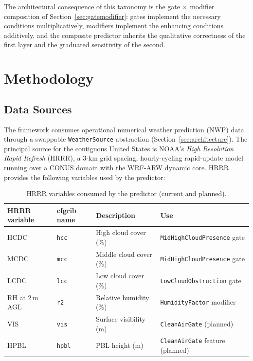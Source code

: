 \documentclass[11pt,a4paper]{article}
\begin{document}
The architectural consequence of this taxonomy is the gate $\times$ modifier composition of Section~\ref{sec:gatemodifier}: gates implement the necessary conditions multiplicatively, modifiers implement the enhancing conditions additively, and the composite predictor inherits the qualitative correctness of the first layer and the graduated sensitivity of the second.

\section{Methodology}
\label{sec:methodology}

\subsection{Data Sources}
\label{sec:datasources}

The framework consumes operational numerical weather prediction (NWP) data through a swappable \texttt{WeatherSource} abstraction (Section~\ref{sec:architecture}). The principal source for the contiguous United States is NOAA's \emph{High Resolution Rapid Refresh} (HRRR), a 3-km grid spacing, hourly-cycling rapid-update model running over a CONUS domain with the WRF-ARW dynamic core. HRRR provides the following variables used by the predictor:

\begin{table}[H]
\centering
\small
\begin{tabular}{llll}
\toprule
HRRR variable & cfgrib name & Description & Use \\
\midrule
HCDC & \texttt{hcc} & High cloud cover (\%) & \texttt{MidHighCloudPresence} gate \\
MCDC & \texttt{mcc} & Middle cloud cover (\%) & \texttt{MidHighCloudPresence} gate \\
LCDC & \texttt{lcc} & Low cloud cover (\%) & \texttt{LowCloudObstruction} gate \\
RH at 2\,m AGL & \texttt{r2} & Relative humidity (\%) & \texttt{HumidityFactor} modifier \\
VIS & \texttt{vis} & Surface visibility (m) & \texttt{CleanAirGate} (planned) \\
HPBL & \texttt{hpbl} & PBL height (m) & \texttt{CleanAirGate} feature (planned) \\
\bottomrule
\end{tabular}
\caption{HRRR variables consumed by the predictor (current and planned).}
\label{tab:hrrr_vars}
\end{table}
\end{document}
